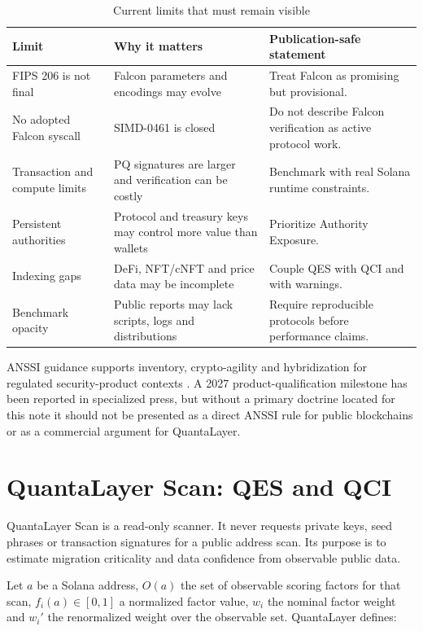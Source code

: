 \documentclass[11pt,a4paper,oneside,parskip=false]{scrartcl}
\newcommand{\QES}{\textsc{QES}}
\newcommand{\QCI}{\textsc{QCI}}
\begin{document}
\begin{table}[htbp]
\centering
\caption{Current limits that must remain visible}
\label{tab:current-limits}
\small
\begin{tabularx}{\textwidth}{L{0.28\textwidth}Y Y}
\toprule
\textbf{Limit} & \textbf{Why it matters} & \textbf{Publication-safe statement} \\
\midrule
FIPS 206 is not final & Falcon parameters and encodings may evolve & Treat Falcon as promising but provisional. \\
No adopted Falcon syscall & SIMD-0461 is closed & Do not describe Falcon verification as active protocol work. \\
Transaction and compute limits & PQ signatures are larger and verification can be costly & Benchmark with real Solana runtime constraints. \\
Persistent authorities & Protocol and treasury keys may control more value than wallets & Prioritize Authority Exposure. \\
Indexing gaps & DeFi, NFT/cNFT and price data may be incomplete & Couple \QES{} with \QCI{} and with warnings. \\
Benchmark opacity & Public reports may lack scripts, logs and distributions & Require reproducible protocols before performance claims. \\
\bottomrule
\end{tabularx}
\end{table}

ANSSI guidance supports inventory, crypto-agility and hybridization for regulated security-product contexts \cite{anssi-pqc-faq,anssi-pqc-page,anssi-pqc-position}. A 2027 product-qualification milestone has been reported in specialized press, but without a primary doctrine located for this note it should not be presented as a direct ANSSI rule for public blockchains or as a commercial argument for QuantaLayer.

\section{QuantaLayer Scan: \QES{} and \QCI{}}

QuantaLayer Scan is a read-only scanner. It never requests private keys, seed phrases or transaction signatures for a public address scan. Its purpose is to estimate migration criticality and data confidence from observable public data.

Let \(a\) be a Solana address, \(O(a)\) the set of observable scoring factors for that scan, \(f_i(a)\in[0,1]\) a normalized factor value, \(w_i\) the nominal factor weight and \(w_i'\) the renormalized weight over the observable set. QuantaLayer defines:
\end{document}
